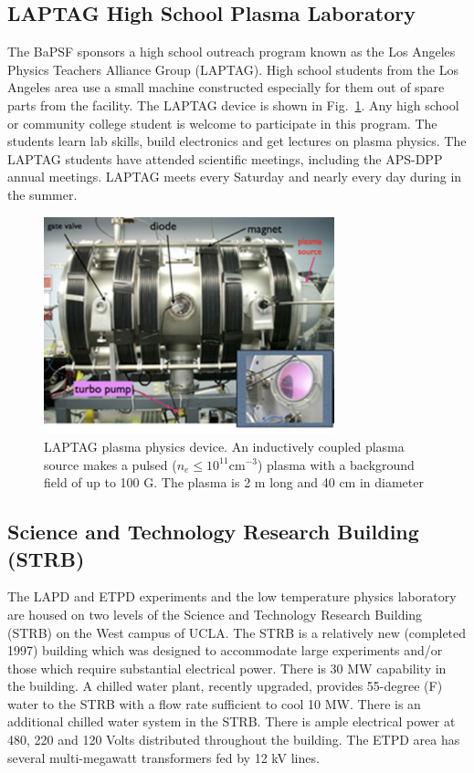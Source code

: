 \documentclass[11pt]{article}
\begin{document}
\subsection{LAPTAG High School Plasma Laboratory}
The BaPSF sponsors a high school outreach program known as the Los Angeles Physics Teachers Alliance Group  (LAPTAG).  High school students from the Los Angeles area use a small machine constructed especially for them out of spare parts from the facility.  The LAPTAG device is shown in Fig.\ \ref{fig:laptag}.  Any high school or community college student is welcome to participate in this program.  The students learn lab skills, build electronics and get lectures on plasma physics. The LAPTAG students have attended scientific meetings, including the APS-DPP annual meetings.  LAPTAG meets every Saturday and nearly every day during in the summer.
\begin{figure}[htbp] %
   \centering
   \includegraphics[width=0.75\textwidth]{laptag.jpg} 
   \caption{LAPTAG plasma physics device.  An inductively coupled plasma source makes a pulsed ($n_{e}\le 10^{11}$cm$^{-3}$) plasma with a background field of up to 100 G.  The plasma is 2 m long and 40 cm in diameter}
   \label{fig:laptag}
\end{figure}


\subsection{Science and Technology Research Building (STRB)}
The LAPD and ETPD experiments and the low temperature physics laboratory are housed on two levels of the Science and Technology Research Building (STRB) on the West campus of UCLA.  The STRB is a relatively new (completed 1997) building which was designed to accommodate large experiments and/or those which require substantial electrical power.  There is 30 MW capability in the building.  A chilled water plant, recently upgraded, provides 55-degree (F) water to the STRB with a flow rate sufficient to cool 10 MW.  There is an additional chilled water system in the STRB. There is ample electrical power at 480, 220 and 120 Volts distributed throughout the building.  The ETPD area has several multi-megawatt transformers fed by 12 kV lines.
\end{document}
